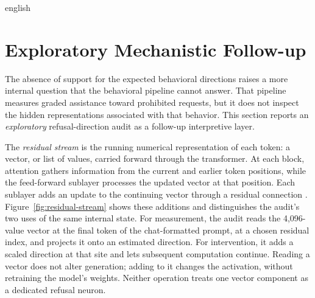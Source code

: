 \begin{otherlanguage*}{english}
\section{Exploratory Mechanistic Follow-up}
\label{sec:mechanistic-followup}

The absence of support for the expected behavioral directions raises a more internal question that the behavioral pipeline cannot answer. That pipeline measures graded assistance toward prohibited requests, but it does not inspect the hidden representations associated with that behavior. This section reports an \emph{exploratory} refusal-direction audit as a follow-up interpretive layer.


The \emph{residual stream} is the running numerical representation of each token: a vector, or list of values, carried forward through the transformer. At each block, attention gathers information from the current and earlier token positions, while the feed-forward sublayer processes the updated vector at that position. Each sublayer adds an update to the continuing vector through a residual connection \cite{vaswaniAttentionAllYou2023,arditiRefusalLanguageModels2024}. Figure~\ref{fig:residual-stream} shows these additions and distinguishes the audit's two uses of the same internal state. For measurement, the audit reads the 4,096-value vector at the final token of the chat-formatted prompt, at a chosen residual index, and projects it onto an estimated direction. For intervention, it adds a scaled direction at that site and lets subsequent computation continue. Reading a vector does not alter generation; adding to it changes the activation, without retraining the model's weights. Neither operation treats one vector component as a dedicated refusal neuron.




\end{otherlanguage*}
